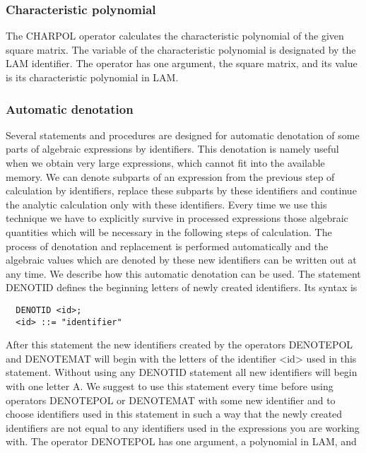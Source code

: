\subsubsection{Characteristic polynomial}


     The CHARPOL operator calculates  the  characteristic  polynomial of
the given  square matrix.  The variable of the characteristic polynomial
is designated by the LAM identifier. The operator has one  argument, the
square matrix, and its value is its characteristic polynomial in LAM.


\subsubsection{Automatic denotation}

     Several  statements  and  procedures  are  designed  for  automatic
denotation of some parts of algebraic  expressions by  identifiers. This
denotation is namely useful when we obtain very large expressions, which
cannot fit into the available  memory.  We  can  denote  subparts  of an
expression from the previous step of calculation by identifiers, replace
these  subparts   by  these   identifiers  and   continue  the  analytic
calculation  only  with  these  identifiers.  Every  time  we  use  this
technique we have to explicitly survive  in processed  expressions those
algebraic quantities  which will  be necessary in the following steps of
calculation. The process  of  denotation  and  replacement  is performed
automatically and  the algebraic  values which  are denoted by these new
identifiers can be  written  out  at  any  time.  We  describe  how this
automatic denotation can be used.
     The  statement  DENOTID  defines  the  beginning  letters  of newly
created identifiers. Its syntax is
\begin{verbatim}
  DENOTID <id>;
  <id> ::= "identifier"
\end{verbatim}
After this  statement  the  new  identifiers  created  by  the operators
DENOTEPOL and  DENOTEMAT will  begin with  the letters of the identifier
<id> used in this statement. Without using any DENOTID statement all new
identifiers  will  begin  with  one  letter  A.  We  suggest to use this
statement every time before using operators DENOTEPOL or  DENOTEMAT with
some new  identifier and to choose identifiers used in this statement in
such a way that the newly  created  identifiers  are  not  equal  to any
identifiers used in the expressions you are working with.
     The operator  DENOTEPOL has  one argument, a polynomial in LAM, and
